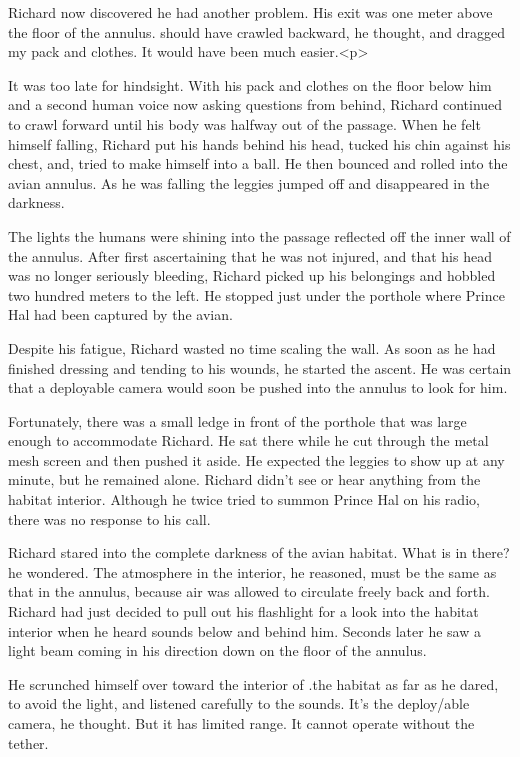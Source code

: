 \documentclass[]{article}
\begin{document}
{Richard now discovered he had another problem. His exit was one meter above the floor of the annulus. should have crawled backward, he thought, and dragged my pack and clothes. It would have been much easier.<p>

It was too late for hindsight. With his pack and clothes on the floor below him and a second human voice now asking questions from behind, Richard continued to crawl forward until his body was halfway out of the passage. When he felt himself falling, Richard put his hands behind his head, tucked his chin against his chest, and, tried to make himself into a ball. He then bounced and rolled into the avian annulus. As he was falling the leggies jumped off and disappeared in the darkness.

The lights the humans were shining into the passage reflected off the inner wall of the annulus. After first ascertaining that he was not injured, and that his head was no longer seriously bleeding, Richard picked up his belongings and hobbled two hundred meters to the left. He stopped just under the porthole where Prince Hal had been captured by the avian.

Despite his fatigue, Richard wasted no time scaling the wall. As soon as he had finished dressing and tending to his wounds, he started the ascent. He was certain that a deployable camera would soon be pushed into the annulus to look for him.

Fortunately, there was a small ledge in front of the porthole that was large enough to accommodate Richard. He sat there while he cut through the metal mesh screen and then pushed it aside. He expected the leggies to show up at any minute, but he remained alone. Richard didn’t see or hear anything from the habitat interior. Although he twice tried to summon Prince Hal on his radio, there was no response to his call.

Richard stared into the complete darkness of the avian habitat. What is in there? he wondered. The atmosphere in the interior, he reasoned, must be the same as that in the annulus, because air was allowed to circulate freely back and forth. Richard had just decided to pull out his flashlight for a look into the habitat interior when he heard sounds below and behind him. Seconds later he saw a light beam coming in his direction down on the floor of the annulus.

He scrunched himself over toward the interior of .the habitat as far as he dared, to avoid the light, and listened carefully to the sounds. It’s the deploy/able camera, he thought. But it has limited range. It cannot operate without the tether.

}
\end{document}
